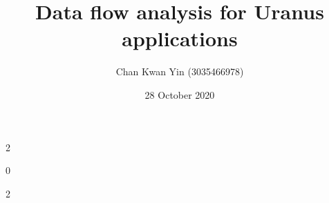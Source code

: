 \documentclass[a4paper, 12pt]{article}
\title{Data flow analysis for Uranus applications}
\author{Chan Kwan Yin (3035466978)}
\date{28 October 2020}
\theoremstyle{definition}
\begin{document}


\thispagestyle{empty}

\newpage

\thispagestyle{empty}
\setlength\columnsep{3em}
\begin{multicols}2
	\tableofcontents
	\listoffigures
	\listoftables
	\lstlistoflistings
\end{multicols}

\setcounter{page}0
\newpage



\setlength\parskip{1.3em}











\newpage
{}
\begin{multicols}2
	
	{}
\end{multicols}
\end{document}
